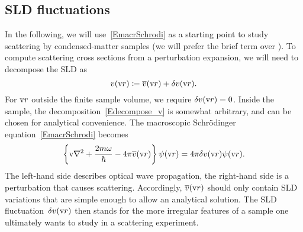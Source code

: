 \subsection{SLD fluctuations}\label{Sfluct}

In the following, we will use~\cref{EmacrSchrodi}
as a starting point to study scattering by condensed-matter samples
(we will prefer the brief term  over ).
%
%
To compute scattering cross sections from a perturbation expansion,
%
we will need to decompose the SLD as
\begin{equation}\label{Edecompose_v}
  v(\text{v}{r}) \coloneqq \overline{v}(\text{v}{r}) + \delta v(\text{v}{r}).
\end{equation}
%
%
For $\text{v}{r}$ outside the finite sample volume, we require $\delta v(\text{v}{r})=0$.
Inside the sample, the decomposition~\cref{Edecompose_v} is somewhat arbitrary,
and can be chosen for analytical convenience.
The macroscopic Schrödinger equation~\cref{EmacrSchrodi} becomes
\begin{equation}\label{ESchrodi3}
  \left\{ \text{v}{\nabla}^2 + \frac{2m\omega}{\hbar} - 4\pi\overline{v}(\text{v}{r}) \right\}\psi(\text{v}{r})
  = 4\pi\delta v(\text{v}{r})\psi(\text{v}{r}).
\end{equation}
The left-hand side describes optical wave propagation,
the right-hand side is a perturbation that causes scattering.
%
%
Accordingly, $\overline{v}(\text{v}{r})$ should only contain SLD variations
that are simple enough to allow an analytical solution.
The SLD fluctuation~$\delta v(\text{v}{r})$ then stands for the more irregular
features of a sample one ultimately wants to study in a scattering experiment.

